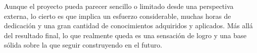 Aunque el proyecto pueda parecer sencillo o limitado desde una perspectiva externa, lo cierto es que implica un esfuerzo considerable, muchas horas de dedicación y una gran cantidad de conocimientos adquiridos y aplicados. Más allá del resultado final, lo que realmente queda es una sensación de logro y una base sólida sobre la que seguir construyendo en el futuro.

